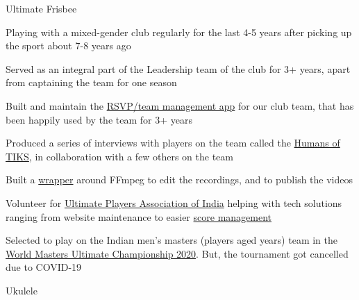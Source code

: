 
\begin{cventries}
  \cventry
      {Ultimate Frisbee }
      {}
      {} %
      {} %
      {
        \begin{cvitems} %
        \item {Playing with a mixed-gender club regularly for the last 4-5 years after picking up the sport about 7-8 years ago}
        \item {Served as an integral part of the Leadership team of the club for 3+ years, apart from captaining the team for one season}
        \item {Built and maintain the \href{https://rsvp.thatteidlikaalsoup.team/features}{RSVP/team management app} for our club team, that has been happily used by the team for 3+ years}
        \item {Produced a series of interviews with players on the team called the \href{https://www.instagram.com/tiks_ultimate/channel/}{Humans of TIKS}, in collaboration with a few others on the team}
        \item {Built a \href{https://github.com/thatte-idli-kaal-soup/humans}{wrapper} around FFmpeg to edit the recordings, and to publish the videos}
        \item {Volunteer for \href{https://indiaultimate.org}{Ultimate Players Association of India} helping with tech solutions ranging from website maintenance to easier \href{https://sotg.indiaultimate.org/about}{score management}}
        \item {Selected to play on the Indian men's masters (players aged  years) team in the \href{https://wmuc2020.com/}{World Masters Ultimate Championship 2020}. But, the tournament got cancelled due to COVID-19}
        \end{cvitems}
      }
  \cventry
      {Ukulele \faGuitar}
      {}
      {} %
      {} %
      {
        \begin{cvitems} %

\end{cvitems}}
\end{cventries}
